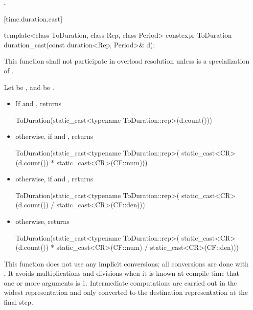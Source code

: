 \begin{itemdescr}
\pnum
\returns
{}.
\end{itemdescr}

[time.duration.cast]{}

%
%
\begin{itemdecl}
template<class ToDuration, class Rep, class Period>
  constexpr ToDuration duration_cast(const duration<Rep, Period>& d);
\end{itemdecl}

\begin{itemdescr}
\pnum
\remarks
This function shall not participate in overload resolution
unless  is a specialization of .

\pnum
\returns
Let  be , and  be .
\begin{itemize}
\item If  and , returns
\begin{codeblock}
ToDuration(static_cast<typename ToDuration::rep>(d.count()))
\end{codeblock}

\item otherwise, if  and , returns
\begin{codeblock}
ToDuration(static_cast<typename ToDuration::rep>(
  static_cast<CR>(d.count()) * static_cast<CR>(CF::num)))
\end{codeblock}

\item otherwise, if  and , returns
\begin{codeblock}
ToDuration(static_cast<typename ToDuration::rep>(
  static_cast<CR>(d.count()) / static_cast<CR>(CF::den)))
\end{codeblock}

\item otherwise, returns
\begin{codeblock}
ToDuration(static_cast<typename ToDuration::rep>(
  static_cast<CR>(d.count()) * static_cast<CR>(CF::num) / static_cast<CR>(CF::den)))
\end{codeblock}
\end{itemize}

\pnum
\begin{note}
This function does not use any implicit conversions; all conversions
are done with . It avoids multiplications and divisions when
it is known at compile time that one or more arguments is 1. Intermediate
computations are carried out in the widest representation and only converted to
the destination representation at the final step.
\end{note}
\end{itemdescr}


